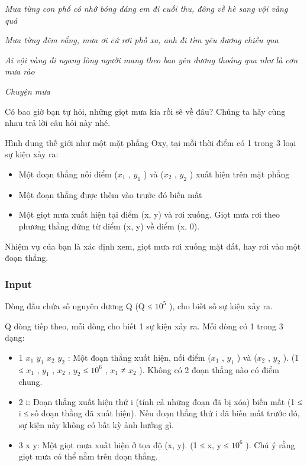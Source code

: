 

\emph{Mưa từng con phố có nhớ bóng dáng em đi cuối thu, đông về hè sang vội vàng quá }

\emph{Mưa từng đêm vắng, mưa ơi cứ rơi phố xa, anh đi tìm yêu đương chiều qua }

\emph{Ai vội vàng đi ngang lòng người mang theo bao yêu đương thoáng qua như là cơn mưa rào }

\emph{Chuyện mưa }

Có bao giờ bạn tự hỏi, những giọt mưa kia rồi sẽ về đâu? Chúng ta hãy cùng nhau trả lời câu hỏi này nhé.

Hình dung thế giới như một mặt phẳng Oxy, tại mỗi thời điểm có 1 trong 3 loại sự kiện xảy ra:
\begin{itemize}
	\item Một đoạn thẳng nối điểm ($x_{1}$ , $y_{1}$ ) và ($x_{2}$ , $y_{2}$ ) xuất hiện trên mặt phẳng
	\item Một đoạn thẳng được thêm vào trước đó biến mất
	\item Một giọt mưa xuất hiện tại điểm (x, y) và rơi xuống. Giọt mưa rơi theo phương thẳng đứng từ điểm (x, y) về điểm (x, 0).
\end{itemize}

Nhiệm vụ của bạn là xác định xem, giọt mưa rơi xuống mặt đất, hay rơi vào một đoạn thẳng.

\subsubsection{Input}

Dòng đầu chứa số nguyên dương Q (Q ≤ $10^{5}$ ), cho biết số sự kiện xảy ra.

Q dòng tiếp theo, mỗi dòng cho biết 1 sự kiện xảy ra. Mỗi dòng có 1 trong 3 dạng:
\begin{itemize}
	\item 1 $x_{1}$ $y_{1}$ $x_{2}$ $y_{2}$ : Một đoạn thẳng xuất hiện, nối điểm ($x_{1}$ , $y_{1}$ ) và ($x_{2}$ , $y_{2}$ ). (1 ≤ $x_{1}$ , $y_{1}$ , $x_{2}$ , $y_{2}$ ≤ $10^{6}$ , $x_{1}$ ≠ $x_{2}$ ). Không có 2 đoạn thẳng nào có điểm chung.
	\item 2 i: Đoạn thẳng xuất hiện thứ i (tính cả những đoạn đã bị xóa) biến mất (1 ≤ i ≤ số đoạn thẳng đã xuất hiện). Nếu đoạn thẳng thứ i đã biến mất trước đó, sự kiện này không có bất kỳ ảnh hưởng gì.
	\item 3 x y: Một giọt mưa xuất hiện ở tọa độ (x, y). (1 ≤ x, y ≤ $10^{6}$ ). Chú ý rằng giọt mưa có thể nằm trên đoạn thẳng.
\end{itemize}

